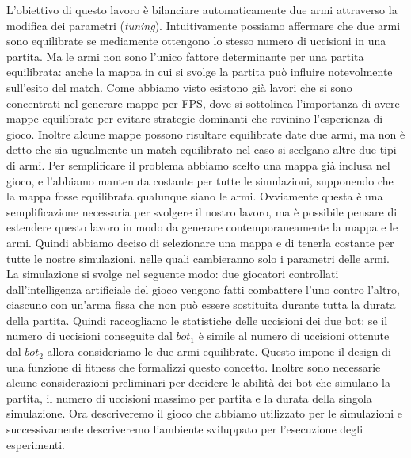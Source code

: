 \documentclass[12pt, italian]{toptesi}
\begin{document}
L'obiettivo di questo lavoro è bilanciare automaticamente due armi attraverso la modifica dei parametri (\emph{tuning}).
Intuitivamente possiamo affermare che due armi sono equilibrate se mediamente ottengono lo stesso numero di uccisioni in una partita. 
Ma le armi non sono l'unico fattore determinante per una partita equilibrata: anche la mappa in cui si svolge la partita può influire notevolmente sull'esito del match.
Come abbiamo visto esistono già lavori che si sono concentrati nel generare mappe per FPS, dove si sottolinea l'importanza di avere mappe equilibrate per evitare strategie dominanti che rovinino l'esperienza di gioco.
Inoltre alcune mappe possono risultare equilibrate date due armi, ma non è detto che sia ugualmente un match equilibrato nel caso si scelgano altre due tipi di armi.
Per semplificare il problema abbiamo scelto una mappa già inclusa nel gioco, e l'abbiamo mantenuta costante per tutte le simulazioni, supponendo che la mappa fosse equilibrata qualunque siano le armi. Ovviamente questa è una semplificazione necessaria per svolgere il nostro lavoro, ma è possibile pensare di estendere questo lavoro in modo da generare contemporaneamente la mappa e le armi. 
Quindi abbiamo deciso di selezionare una mappa e di tenerla costante per tutte le nostre simulazioni, nelle quali cambieranno solo i parametri delle armi.
La simulazione si svolge nel seguente modo: due giocatori controllati dall'intelligenza artificiale del gioco vengono fatti combattere l'uno contro l'altro, ciascuno con un'arma fissa che non può essere sostituita durante tutta la durata della partita.
Quindi raccogliamo le statistiche delle uccisioni dei due bot: se il numero di uccisioni conseguite dal $bot_1$ è simile al numero di uccisioni ottenute dal $bot_2$ allora consideriamo le due armi equilibrate.
Questo impone il design di una funzione di fitness che formalizzi questo concetto.
Inoltre sono necessarie alcune considerazioni preliminari per decidere le abilità dei bot che simulano la partita, il numero di uccisioni massimo per partita e la durata della singola simulazione.
Ora descriveremo il gioco che abbiamo utilizzato per le simulazioni e successivamente descriveremo l'ambiente sviluppato per l'esecuzione degli esperimenti.
\end{document}
